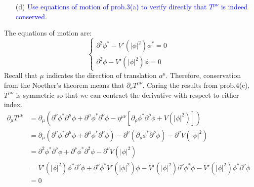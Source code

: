 \documentclass[11pt, a4paper]{article}
\begin{document}
\begin{enumerate}
    \item [(d)] \textcolor{blue}{
    Use equations of motion of prob.3(a) to verify directly that $T^{\mu\nu}$ is indeed conserved.
    }
\end{enumerate}
The equations of motion are:
\begin{equation}
    \begin{cases}
        \partial^2\phi^* - V'(|\phi|^2) \phi^* = 0 \\
        \partial^2\phi - V'(|\phi|^2) \phi = 0
    \end{cases}
\end{equation}
Recall that $\mu$ indicates the direction of translation $a^\mu$.
Therefore, conservation from the Noether's theorem means that $\partial_\nu T^{\mu\nu}$.
Caring the results from prob.4(c), $T^{\mu\nu}$ is symmetric so that we can contract the derivative with respect to either index.
\begin{align}
    \partial_\mu T^{\mu\nu} & = \partial_\mu(\partial^\nu \phi^* \partial^\mu \phi + \partial^\mu\phi^*\partial^\nu\phi - \eta^{\mu\nu}\left[\partial_\rho \phi^* \partial^\rho \phi + V(|\phi|^2) \right]) \\
    & = \partial_\mu(\partial^\nu \phi^* \partial^\mu \phi + \partial^\mu\phi^*\partial^\nu\phi ) -\partial^\nu(\partial_\rho \phi^* \partial^\rho \phi) - \partial^\nu V(|\phi|^2) \\
    & = \partial^2\phi^* \partial^\nu\phi + \partial^\nu\phi^* \partial^2\phi - \partial^\nu V(|\phi|^2) \\
    & = V'(|\phi|^2) \phi^* \partial^\nu\phi + \partial^\nu\phi^* V'(|\phi|^2) \phi - V'(|\phi|^2) \partial^\nu\phi^* \phi - V'(|\phi|^2) \phi^* \partial^\nu \phi \\
    & = 0
\end{align}
\end{document}
